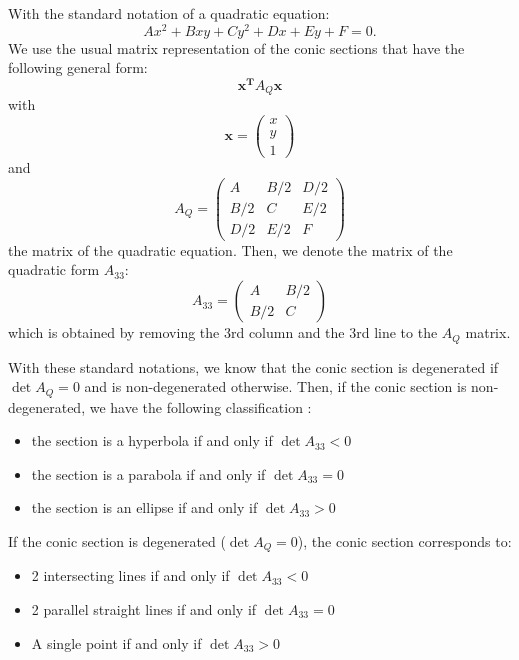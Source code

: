 \documentclass{article}
\begin{document}
With the standard notation of a quadratic equation:
\begin{equation}
    Ax^2+Bxy+Cy^2+Dx+Ey+F=0.
\end{equation}
We use the usual matrix representation of the conic sections that have the following general form:
\begin{equation}
    \mathbf{x^T} A_Q \mathbf{x}
\end{equation}
with 
\begin{equation}
    \mathbf{x} = \begin{pmatrix} x \\ y\\ 1 \end{pmatrix}
\end{equation}
and
\begin{equation}
    A_Q = \begin{pmatrix}
    A & B/2 & D/2 \\
    B/2 & C & E/2 \\
    D/2 & E/2 & F
\end{pmatrix}
\end{equation}
the matrix of the quadratic equation.
Then, we denote the matrix of the quadratic form $A_{33}$:
\begin{equation}
    A_{33} = \begin{pmatrix} A & B/2 \\ B/2 & C \end{pmatrix}
\end{equation}
which is obtained by removing the 3rd column and the 3rd line to the $A_Q$ matrix.

With these standard notations, we know that the conic section is degenerated if $\det A_Q = 0$ and is non-degenerated otherwise. Then, if the conic section is non-degenerated, we have the following classification :
\begin{itemize}
    \item the section is a hyperbola if and only if $\det A_{33} <0$
    \item the section is a parabola if and only if $\det A_{33} =0$
    \item the section is an ellipse if and only if $\det A_{33} >0$
\end{itemize}
If the conic section is degenerated ($\det A_Q = 0$), the conic section corresponds to:
\begin{itemize}
    \item 2 intersecting lines if and only if $\det A_{33} <0$
    \item 2 parallel straight lines if and only if $\det A_{33} =0$
    \item A single point if and only if $\det A_{33} >0$
\end{itemize}
\end{document}
